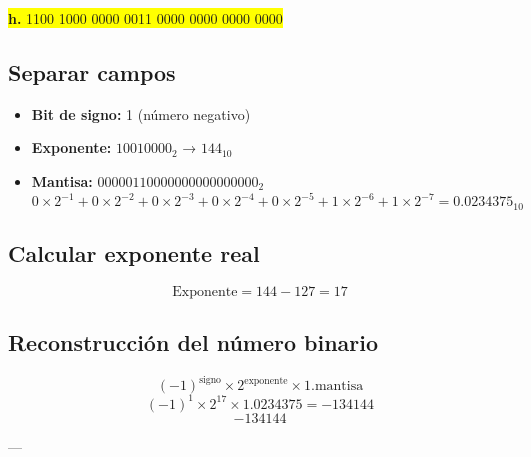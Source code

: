 \documentclass[a4paper,12pt]{article}
\begin{document}
	\begin{center}
		\colorbox{yellow}{\textbf{h.} 1100 1000 0000 0011 0000 0000 0000 0000}
		
		\subsection*{Separar campos}
		
		\begin{itemize}
			\item \textbf{Bit de signo:} 1 (número negativo)
			\item \textbf{Exponente:} $10010000_2$ → $144_{10}$
			\item \textbf{Mantisa:} $00000110000000000000000_2$ 
			\[
			0\times2^{-1} + 0\times2^{-2} + 0\times2^{-3} + 0\times2^{-4} + 0\times2^{-5} + 1\times2^{-6} + 1\times2^{-7} = 0.0234375_{10}
			\]
		\end{itemize}
		
		\subsection*{Calcular exponente real}
		
		\[
		\text{Exponente} = 144 - 127 = 17
		\]
		
		
		
		\subsection*{Reconstrucción del número binario}	
		\[
		(-1)^{\text{signo}} \times 2^{\text{exponente}} \times 1.\text{mantisa}
		\]
		\[
		(-1)^1 \times 2^17 \times 1.0234375 = -134144
		\]
		\vspace{1em}
		\[
		\boxed{-134144}
		\]
		
		---
	\end{center}
\end{document}
